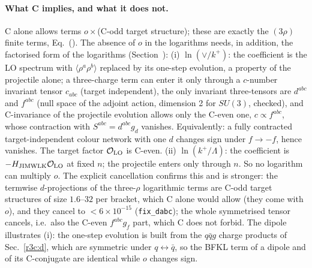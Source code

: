 \paragraph{What C implies, and what it does not.} C alone allows terms $o\times$(C-odd target structure); these are exactly the $(3\rho)$ finite terms, Eq.~(). The absence of $o$ in the logarithms needs, in addition, the factorised form of the logarithms (Section~): (i) $\ln(\vee/k^+)$: the coefficient is the LO spectrum with $\langle\rho^a\rho^b\rangle$ replaced by its one-step evolution, a property of the projectile alone; a three-charge term can enter it only through a $c$-number invariant tensor $c_{abc}$ (target independent), the only invariant three-tensors are $d^{abc}$ and $f^{abc}$ (null space of the adjoint action, dimension 2 for $SU(3)$, checked), and C-invariance of the projectile evolution allows only the C-even one, $c\propto f^{abc}$, whose contraction with $S^{abc}=d^{abc}g_d$ vanishes. Equivalently: a fully contracted target-independent colour network with one $d$ changes sign under $f\to-f$, hence vanishes. The target factor $\mathcal O_{\rm LO}$ is C-even. (ii) $\ln(k^+/\Lambda)$: the coefficient is $-H_{\rm JIMWLK}\mathcal O_{\rm LO}$ at fixed $n$; the projectile enters only through $n$. So no logarithm can multiply $o$. The explicit cancellation confirms this and is stronger: the termwise $d$-projections of the three-$\rho$ logarithmic terms are C-odd target structures of size $1.6$--$32$ per bracket, which C alone would allow (they come with $o$), and they cancel to $<6\times10^{-15}$ (\texttt{fix\_dabc}); the whole symmetrised tensor cancels, i.e.\ also the C-even $f^{abc}g_f$ part, which C does not forbid. The dipole illustrates (i): the one-step evolution is built from the $q\bar qg$ charge products of Sec.~\ref{r3c:d}, which are symmetric under $q\leftrightarrow\bar q$, so the BFKL term of a dipole and of its C-conjugate are identical while $o$ changes sign.

